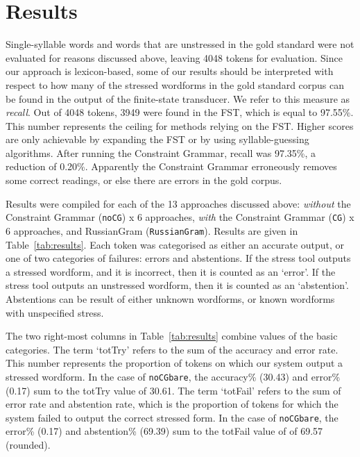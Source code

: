 \documentclass[11pt]{article}
\newcommand{\rr}[1]{\marginpar{\scriptsize R: #1}} %
\begin{document}
\section{Results}

Single-syllable words and words that are unstressed in the gold standard were
not evaluated for reasons discussed above, leaving 4048 tokens for evaluation.
Since our approach is lexicon-based, some of our results should be interpreted
with respect to how many of the stressed wordforms in the gold standard corpus
can be found in the output of the finite-state transducer. We refer to this 
measure as \emph{recall}. Out of 4048 tokens, 3949 were 
found in the FST, which is equal to 97.55\%.
This number represents the ceiling for methods relying on the FST.
Higher scores are only achievable by expanding the FST or by using 
syllable-guessing algorithms. After running the Constraint Grammar, recall was 
97.35\%, a reduction of 0.20\%. Apparently the Constraint Grammar erroneously 
removes some correct readings, or else there are errors in the gold corpus.

Results were compiled for each of the 13 approaches discussed above: 
\emph{without} the Constraint Grammar ({\small {\tt noCG}}) x 6 approaches, 
\emph{with} the Constraint Grammar ({\small {\tt CG}}) x 6 approaches, 
and RussianGram ({\small {\tt RussianGram}}). Results are given in 
Table~\ref{tab:results}. Each token was categorised as either an accurate output, 
or one of two categories of failures: errors and abstentions. 
If the stress tool outputs a stressed wordform, and it is incorrect, then it is
counted as an `error'. If the stress tool outputs an unstressed wordform, then
it is counted as an `abstention'. Abstentions can be result of either unknown
wordforms, or known wordforms with unspecified stress.

The two right-most columns in 
Table~\ref{tab:results} combine values of the basic categories. The term `totTry' 
refers to the sum of the accuracy and error rate. This number represents the 
proportion of tokens on which our system output a stressed wordform. In the case 
of {\small {\tt noCGbare}}, the accuracy\% (30.43) and error\% (0.17) sum to the 
totTry value of 30.61. The term `totFail' refers to the sum of error rate 
and abstention rate, which is the 
proportion of tokens for which the system failed to output the correct stressed 
form. In the case of {\small {\tt noCGbare}}, the error\% (0.17) 
and abstention\% (69.39) sum to the totFail value of of 69.57 (rounded). 
\end{document}
